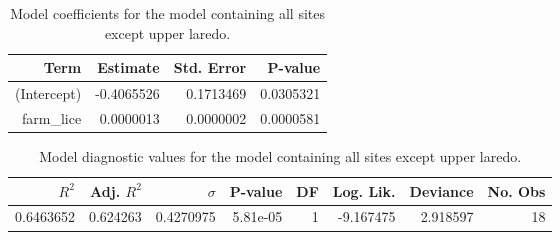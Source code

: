 \begin{table}
\centering
\caption{Model coefficients for the model containing all sites except
    upper laredo.}
\centering
\begin{tabular}[t]{rrrr}
\toprule
Term & Estimate & Std. Error & P-value\\
\midrule
(Intercept) & -0.4065526 & 0.1713469 & 0.0305321\\
farm\_lice & 0.0000013 & 0.0000002 & 0.0000581\\
\bottomrule
\end{tabular}
\end{table}

\begin{table}
\centering
\caption{Model diagnostic values for the model containing all sites
    except upper laredo.}
\centering
\begin{tabular}[t]{rrrrrrrr}
\toprule
$R^2$ & Adj. $R^2$ & $\sigma$ & P-value & DF & Log. Lik. & Deviance & No. Obs\\
\midrule
0.6463652 & 0.624263 & 0.4270975 & 5.81e-05 & 1 & -9.167475 & 2.918597 & 18\\
\bottomrule
\end{tabular}
\end{table}
